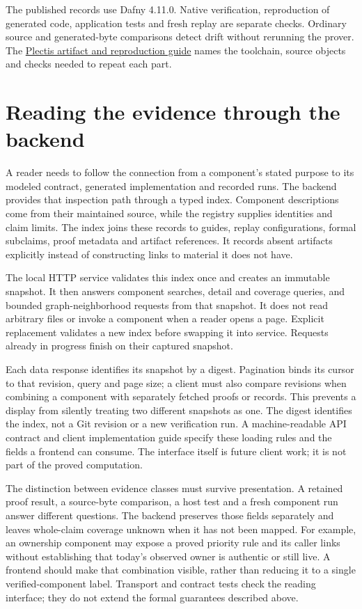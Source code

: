 \documentclass[11pt]{article}
\newcommand{\repourl}{https://github.com/wcook04/practical-formal-verification}
\newcommand{\artifactguide}{\href{\repourl/blob/main/paper/README.md}{Plectis artifact and reproduction guide}}
\begin{document}
The published records use Dafny 4.11.0. Native verification, reproduction of
generated code, application tests and fresh replay are separate checks. Ordinary
source and generated-byte comparisons detect drift without rerunning the
prover. The \artifactguide{} names the toolchain, source objects and checks
needed to repeat each part.

\section{Reading the evidence through the backend}
\label{sec:inspection}
A reader needs to follow the connection from a component's stated purpose to
its modeled contract, generated implementation and recorded runs. The backend
provides that inspection path through a typed index. Component descriptions
come from their maintained source, while the registry supplies identities and
claim limits. The index joins these records to guides, replay configurations,
formal subclaims, proof metadata and artifact references. It records absent
artifacts explicitly instead of constructing links to material it does not have.

The local HTTP service validates this index once and creates an immutable
snapshot. It then answers component searches, detail and coverage queries, and
bounded graph-neighborhood requests from that snapshot. It does not read
arbitrary files or invoke a component when a reader opens a page. Explicit
replacement validates a new index before swapping it into service. Requests
already in progress finish on their captured snapshot.

Each data response identifies its snapshot by a digest. Pagination binds its
cursor to that revision, query and page size; a client must also compare
revisions when combining a component with separately fetched proofs or records.
This prevents a display from silently treating two different snapshots as one.
The digest identifies the index, not a Git revision or a new verification run.
A machine-readable API contract and client implementation guide specify these
loading rules and the fields a frontend can consume. The interface itself is
future client work; it is not part of the proved computation.

The distinction between evidence classes must survive presentation. A retained
proof result, a source-byte comparison, a host test and a fresh component run
answer different questions. The backend preserves those fields separately and
leaves whole-claim coverage unknown when it has not been mapped. For example,
an ownership component may expose a proved priority rule and its caller links
without establishing that today's observed owner is authentic or still live.
A frontend should make that combination visible, rather than reducing it to a
single verified-component label. Transport and contract tests check the reading
interface; they do not extend the formal guarantees described above.
\end{document}
